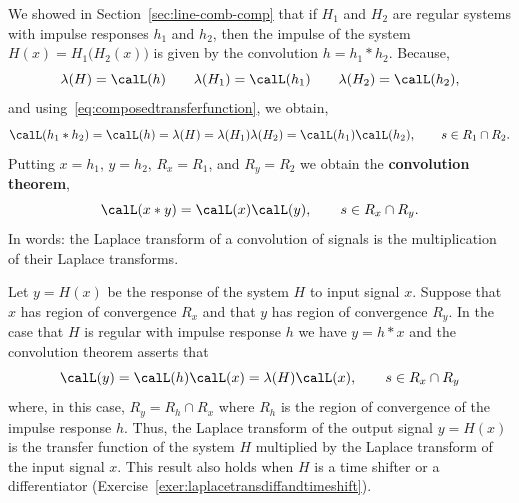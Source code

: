 \documentclass[11pt,a4paper]{book}
\theoremstyle{plain}
\numberwithin{equation}{section}
\newcommand{\term}{\textbf}
\begin{document}

We showed in Section~\ref{sec:line-comb-comp} that if $H_1$ and $H_2$ are regular systems with impulse responses $h_1$ and $h_2$, then the impulse of the system $H(x) = H_1\big(H_2(x)\big)$ is given by the convolution $h = h_1 * h_2$.  Because,
\[
\lambda(H) = \calL(h) \qquad \lambda(H_1) = \calL(h_1) \qquad \lambda(H_2) = \calL(h_2),
\] 
and using~\eqref{eq:composedtransferfunction}, we obtain,
\[
\calL(h_1 * h_2) = \calL(h) =  \lambda(H) = \lambda(H_1)\lambda(H_2) = \calL(h_1) \calL(h_2), \qquad s \in R_1 \cap R_2.
\]
Putting $x = h_1$, $y = h_2$, $R_x = R_1$, and $R_y = R_2$ we obtain the \term{convolution theorem},
\begin{equation}\label{eq:convtheoremlaplace}
\calL(x*y) = \calL(x) \calL(y), \qquad s \in R_x \cap R_y.
\end{equation}
In words: the Laplace transform of a convolution of signals is the multiplication of their Laplace transforms.


Let $y = H(x)$ be the response of the system $H$ to input signal $x$.  Suppose that $x$ has region of convergence $R_x$ and that $y$ has region of convergence $R_y$.  In the case that $H$ is regular with impulse response $h$ we have $y = h * x$ and the convolution theorem asserts that
\begin{equation}\label{eq:transferLaplcetheorem}
\calL(y) = \calL(h)\calL(x) = \lambda(H)\calL(x), \qquad s \in R_x \cap R_y
\end{equation}
where, in this case, $R_y = R_h \cap R_x$ where $R_h$ is the region of convergence of the impulse response $h$.  Thus, the Laplace transform of the output signal $y = H(x)$ is the transfer function of the system $H$ multiplied by the Laplace transform of the input signal $x$.  This result also holds when $H$ is a time shifter or a differentiator (Exercise~\ref{exer:laplacetransdiffandtimeshift}).

\end{document}

